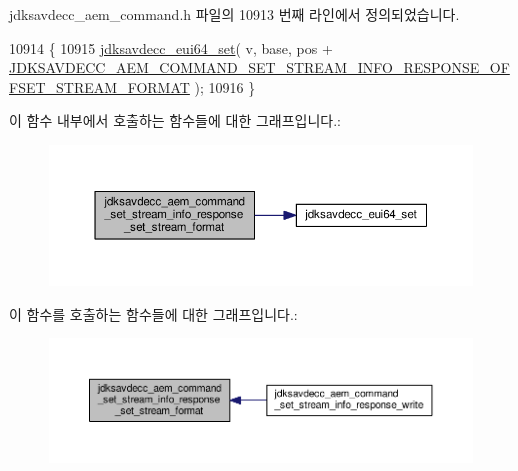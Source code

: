 jdksavdecc\+\_\+aem\+\_\+command.\+h 파일의 10913 번째 라인에서 정의되었습니다.


\begin{DoxyCode}
10914 \{
10915     \hyperlink{group__eui64_ga1c5b342315464ff77cbc7d587765432d}{jdksavdecc\_eui64\_set}( v, base, pos + 
      \hyperlink{group__command__set__stream__info__response_ga5ce2c20d3bc892909bc27dba602826b3}{JDKSAVDECC\_AEM\_COMMAND\_SET\_STREAM\_INFO\_RESPONSE\_OFFSET\_STREAM\_FORMAT}
       );
10916 \}
\end{DoxyCode}


이 함수 내부에서 호출하는 함수들에 대한 그래프입니다.\+:
\nopagebreak
\begin{figure}[H]
\begin{center}
\leavevmode
\includegraphics[width=350pt]{group__command__set__stream__info__response_gaef64a7d1a863402c243688e2221b84f5_cgraph}
\end{center}
\end{figure}




이 함수를 호출하는 함수들에 대한 그래프입니다.\+:
\nopagebreak
\begin{figure}[H]
\begin{center}
\leavevmode
\includegraphics[width=350pt]{group__command__set__stream__info__response_gaef64a7d1a863402c243688e2221b84f5_icgraph}
\end{center}
\end{figure}


